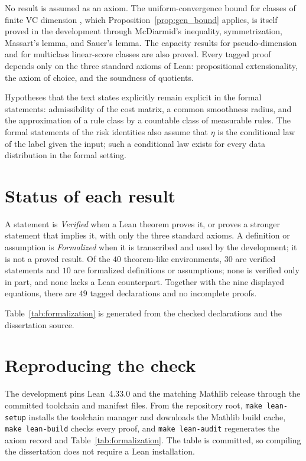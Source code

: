 No result is assumed as an axiom. The uniform-convergence bound for classes of finite VC dimension \citep[Corollary~3.19]{mohri2018foundations}, which Proposition~\ref{prop:gen_bound} applies, is itself proved in the development through McDiarmid's inequality, symmetrization, Massart's lemma, and Sauer's lemma. The capacity results for pseudo-dimension and for multiclass linear-score classes are also proved. Every tagged proof depends only on the three standard axioms of Lean: propositional extensionality, the axiom of choice, and the soundness of quotients.

Hypotheses that the text states explicitly remain explicit in the formal statements: admissibility of the cost matrix, a common smoothness radius, and the approximation of a rule class by a countable class of measurable rules. The formal statements of the risk identities also assume that $\eta$ is the conditional law of the label given the input; such a conditional law exists for every data distribution in the formal setting.

\section{Status of each result}\label{sec:formalization_table}

A statement is \emph{Verified} when a Lean theorem proves it, or proves a stronger statement that implies it, with only the three standard axioms. A definition or assumption is \emph{Formalized} when it is transcribed and used by the development; it is not a proved result. Of the $40$ theorem-like environments, $30$ are verified statements and $10$ are formalized definitions or assumptions; none is verified only in part, and none lacks a Lean counterpart. Together with the nine displayed equations, there are $49$ tagged declarations and no incomplete proofs.



Table~\ref{tab:formalization} is generated from the checked declarations and the dissertation source.

\section{Reproducing the check}\label{sec:formalization_repro}

The development pins Lean~4.33.0 and the matching Mathlib release through the committed toolchain and manifest files. From the repository root, \texttt{make lean-setup} installs the toolchain manager and downloads the Mathlib build cache, \texttt{make lean-build} checks every proof, and \texttt{make lean-audit} regenerates the axiom record and Table~\ref{tab:formalization}. The table is committed, so compiling the dissertation does not require a Lean installation.
